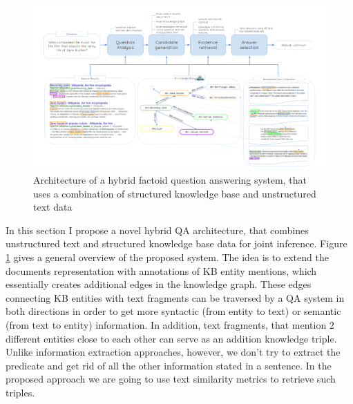 \begin{figure}
\centering
\includegraphics[width=\textwidth]{img/text_and_kb}
\caption{Architecture of a hybrid factoid question answering system, that uses a combination of structured knowledge base and unstructured text data}
\label{figure:factoid:text_kb}
\end{figure}

In this section I propose a novel hybrid QA architecture, that combines unstructured text and structured knowledge base data for joint inference.
Figure \ref{figure:factoid:text_kb} gives a general overview of the proposed system.
The idea is to extend the documents representation with annotations of KB entity mentions, which essentially creates additional edges in the knowledge graph.
These edges connecting KB entities with text fragments can be traversed by a QA system in both directions in order to get more syntactic (from entity to text) or semantic (from text to entity) information.
In addition, text fragments, that mention 2 different entities close to each other can serve as an addition knowledge triple.
Unlike information extraction approaches, however, we don't try to extract the predicate and get rid of all the other information stated in a sentence.
In the proposed approach we are going to use text similarity metrics to retrieve such triples.

